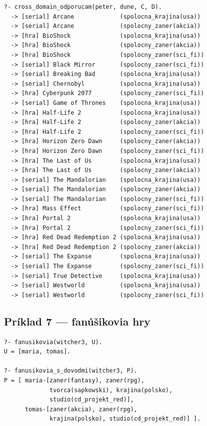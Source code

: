 \documentclass[11pt,a4paper]{article}
\begin{document}
\begin{lstlisting}[numbers=none]
?- cross_domain_odporucam(peter, dune, C, D).
  -> [serial] Arcane             (spolocna_krajina(usa))
  -> [serial] Arcane             (spolocny_zaner(akcia))
  -> [hra] BioShock              (spolocna_krajina(usa))
  -> [hra] BioShock              (spolocny_zaner(akcia))
  -> [hra] BioShock              (spolocny_zaner(sci_fi))
  -> [serial] Black Mirror       (spolocny_zaner(sci_fi))
  -> [serial] Breaking Bad       (spolocna_krajina(usa))
  -> [serial] Chernobyl          (spolocna_krajina(usa))
  -> [hra] Cyberpunk 2077        (spolocny_zaner(sci_fi))
  -> [serial] Game of Thrones    (spolocna_krajina(usa))
  -> [hra] Half-Life 2           (spolocna_krajina(usa))
  -> [hra] Half-Life 2           (spolocny_zaner(akcia))
  -> [hra] Half-Life 2           (spolocny_zaner(sci_fi))
  -> [hra] Horizon Zero Dawn     (spolocny_zaner(akcia))
  -> [hra] Horizon Zero Dawn     (spolocny_zaner(sci_fi))
  -> [hra] The Last of Us        (spolocna_krajina(usa))
  -> [hra] The Last of Us        (spolocny_zaner(akcia))
  -> [serial] The Mandalorian    (spolocna_krajina(usa))
  -> [serial] The Mandalorian    (spolocny_zaner(akcia))
  -> [serial] The Mandalorian    (spolocny_zaner(sci_fi))
  -> [hra] Mass Effect           (spolocny_zaner(sci_fi))
  -> [hra] Portal 2              (spolocna_krajina(usa))
  -> [hra] Portal 2              (spolocny_zaner(sci_fi))
  -> [hra] Red Dead Redemption 2 (spolocna_krajina(usa))
  -> [hra] Red Dead Redemption 2 (spolocny_zaner(akcia))
  -> [serial] The Expanse        (spolocna_krajina(usa))
  -> [serial] The Expanse        (spolocny_zaner(sci_fi))
  -> [serial] True Detective     (spolocna_krajina(usa))
  -> [serial] Westworld          (spolocna_krajina(usa))
  -> [serial] Westworld          (spolocny_zaner(sci_fi))
\end{lstlisting}

\subsection{Príklad 7 --- fanúšikovia hry}

\begin{lstlisting}[numbers=none]
?- fanusikovia(witcher3, U).
U = [maria, tomas].

?- fanusikovia_s_dovodmi(witcher3, P).
P = [ maria-[zaner(fantasy), zaner(rpg),
             tvorca(sapkowski), krajina(polsko),
             studio(cd_projekt_red)],
      tomas-[zaner(akcia), zaner(rpg),
             krajina(polsko), studio(cd_projekt_red)] ].
\end{lstlisting}
\end{document}
